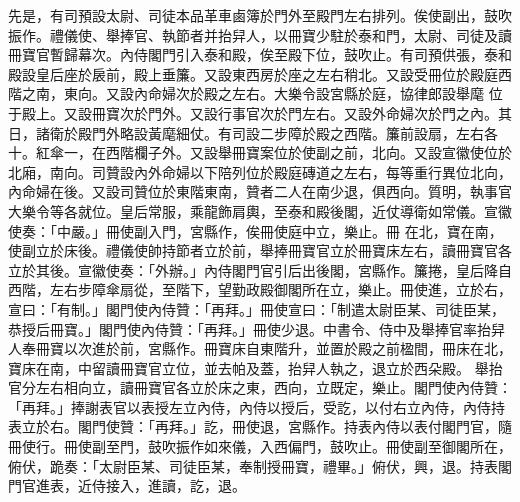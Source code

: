 \begin{pinyinscope}
 先是，有司預設太尉、司徒本品革車鹵簿於門外至殿門左右排列。俟使副出，鼓吹振作。禮儀使、舉捧官、執節者并抬舁人，以冊寶少駐於泰和門，太尉、司徒及讀冊寶官暫歸幕次。內侍閣門引入泰和殿，俟至殿下位，鼓吹止。有司預供張，泰和殿設皇后座於扆前，殿上垂簾。又設東西房於座之左右稍北。又設受冊位於殿庭西階之南，東向。又設內命婦次於殿之左右。大樂令設宮縣於庭，協律郎設舉麾
 位于殿上。又設冊寶次於門外。又設行事官次於門左右。又設外命婦次於門之內。其日，諸衛於殿門外略設黃麾細仗。有司設二步障於殿之西階。簾前設扇，左右各十。紅傘一，在西階欄子外。又設舉冊寶案位於使副之前，北向。又設宣徽使位於北廂，南向。司贊設內外命婦以下陪列位於殿庭磚道之左右，每等重行異位北向，內命婦在後。又設司贊位於東階東南，贊者二人在南少退，俱西向。質明，執事官大樂令等各就位。皇后常服，乘龍飾肩輿，至泰和殿後閣，近仗導衛如常儀。宣徽使奏：「中嚴。」冊使副入門，宮縣作，俟冊使庭中立，樂止。冊
 在北，寶在南，使副立於床後。禮儀使帥持節者立於前，舉捧冊寶官立於冊寶床左右，讀冊寶官各立於其後。宣徽使奏：「外辦。」內侍閣門官引后出後閣，宮縣作。簾捲，皇后降自西階，左右步障傘扇從，至階下，望勤政殿御閣所在立，樂止。冊使進，立於右，宣曰：「有制。」閣門使內侍贊：「再拜。」冊使宣曰：「制遣太尉臣某、司徒臣某，恭授后冊寶。」閣門使內侍贊：「再拜。」冊使少退。中書令、侍中及舉捧官率抬舁人奉冊寶以次進於前，宮縣作。冊寶床自東階升，並置於殿之前楹間，冊床在北，寶床在南，中留讀冊寶官立位，並去帕及蓋，抬舁人執之，退立於西朵殿。
 舉抬官分左右相向立，讀冊寶官各立於床之東，西向，立既定，樂止。閣門使內侍贊：「再拜。」捧謝表官以表授左立內侍，內侍以授后，受訖，以付右立內侍，內侍持表立於右。閣門使贊：「再拜。」訖，冊使退，宮縣作。持表內侍以表付閣門官，隨冊使行。冊使副至門，鼓吹振作如來儀，入西偏門，鼓吹止。冊使副至御閣所在，俯伏，跪奏：「太尉臣某、司徒臣某，奉制授冊寶，禮畢。」俯伏，興，退。持表閣門官進表，近侍接入，進讀，訖，退。




\end{pinyinscope}
